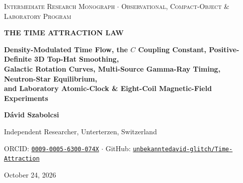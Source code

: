 \documentclass[10pt,a4paper]{article}
\begin{document}
\thispagestyle{titlefoot}
\vspace*{-8mm}
\noindent{\color{navy}\rule{\linewidth}{2pt}}\par\vspace{1.5mm}
\begin{center}
  {\footnotesize\scshape\color{slate}Intermediate Research Monograph $\cdot$ Observational, Compact-Object \& Laboratory Program}\par\vspace{1.5mm}
  {\LARGE\bfseries\color{navy}THE TIME ATTRACTION LAW}\par\vspace{2mm}
  {\large\bfseries\color{slate}Density-Modulated Time Flow, the $C$ Coupling Constant, Positive-Definite 3D Top-Hat Smoothing,}\\
  {\large\bfseries\color{slate}Galactic Rotation Curves, Multi-Source Gamma-Ray Timing, Neutron-Star Equilibrium,}\\
  {\large\bfseries\color{slate}and Laboratory Atomic-Clock \& Eight-Coil Magnetic-Field Experiments}\par\vspace{2mm}
  {\normalsize\bfseries D\'avid Szabolcsi}\par\vspace{1mm}
  {\small Independent Researcher, Unterterzen, Switzerland}\par
  {\small ORCID: \href{https://orcid.org/0009-0005-6300-074X}{\texttt{0009-0005-6300-074X}} $\cdot$ GitHub: \href{https://github.com/unbekanntedavid-glitch/Time-Attraction}{\texttt{unbekanntedavid-glitch/Time-Attraction}}}\par
  {\small October 24, 2026}
\end{center}
\vspace{1.5mm}
\noindent{\color{navy}\rule{\linewidth}{0.8pt}}\par\vspace{2mm}
\end{document}
